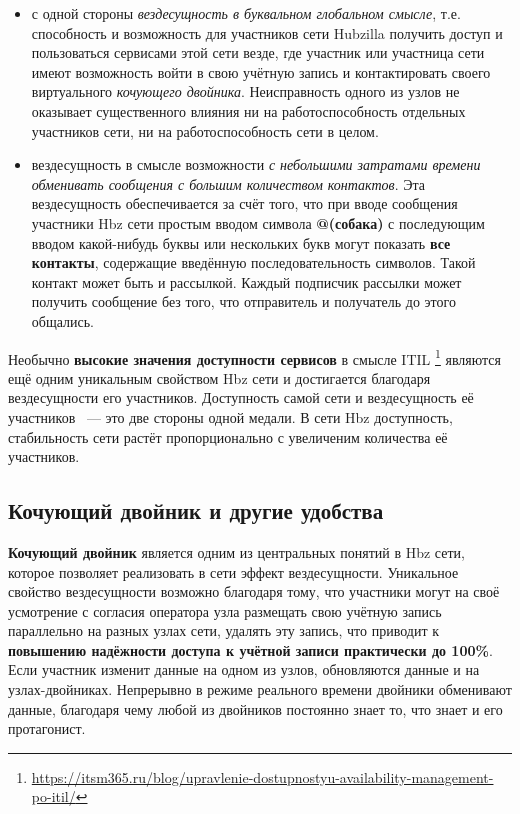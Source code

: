 \documentclass[10pt, a5paper]{article}
\begin{document}
\begin{itemize}
  \item с одной стороны \emph{вездесущность в буквальном глобальном смысле}, т.е. способность и возможность для участников сети Hubzilla получить доступ и пользоваться сервисами этой сети везде, где участник или участница сети имеют возможность войти в свою учётную запись и контактировать своего виртуального \emph{кочующего двойника}. Неисправность одного из узлов не оказывает существенного влияния ни на работоспособность отдельных участников сети, ни на работоспособность сети в целом.
  \item вездесущность в смысле возможности \emph{с небольшими затратами времени обменивать сообщения с большим количеством контактов}. Эта вездесущность обеспечивается за счёт того, что при вводе сообщения участники Hbz сети простым вводом символа \textbf{@(собака)} с последующим вводом какой-нибудь буквы или нескольких букв могут показать \textbf{все контакты}, содержащие введённую последовательность символов. Такой контакт может быть и рассылкой. Каждый подписчик рассылки может получить сообщение без того, что отправитель и получатель до этого общались.
\end{itemize}

Необычно \textbf{высокие значения доступности сервисов} в смысле ITIL \footnote{\url{https://itsm365.ru/blog/upravlenie-dostupnostyu-availability-management-po-itil/}} являются ещё одним уникальным свойством Hbz сети и достигается благодаря вездесущности его участников. Доступность самой сети и вездесущность её участников ~--- это две стороны одной медали. В сети Hbz доступность, стабильность сети растёт пропорционально с увеличеним количества её участников.

\subsection*{Кочующий двойник и другие удобства}

\textbf{Кочующий двойник} является одним из центральных понятий в Hbz сети, которое позволяет реализовать в сети эффект вездесущности. Уникальное свойство  вездесущности возможно благодаря тому, что участники могут на своё усмотрение с согласия оператора узла размещать свою учётную запись параллельно на разных узлах сети, удалять эту запись, что приводит к \textbf{повышению надёжности доступа к учётной записи практически до 100\%}. Если участник изменит данные на одном из узлов, обновляются данные и на узлах-двойниках. Непрерывно в режиме реального времени двойники обменивают данные, благодаря чему любой из двойников постоянно знает то, что знает и его протагонист.
\end{document}

